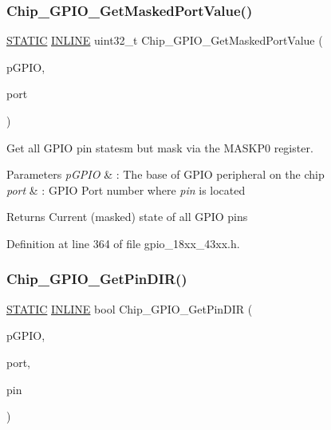 \subsubsection{\texorpdfstring{Chip\+\_\+\+G\+P\+I\+O\+\_\+\+Get\+Masked\+Port\+Value()}{Chip\_GPIO\_GetMaskedPortValue()}}
{\footnotesize\ttfamily \hyperlink{group___l_p_c___types___public___macros_ga10b2d890d871e1489bb02b7e70d9bdfb}{S\+T\+A\+T\+IC} \hyperlink{spifi__18xx__43xx_8h_a2eb6f9e0395b47b8d5e3eeae4fe0c116}{I\+N\+L\+I\+NE} uint32\+\_\+t Chip\+\_\+\+G\+P\+I\+O\+\_\+\+Get\+Masked\+Port\+Value (\begin{DoxyParamCaption}\item[{\hyperlink{struct_l_p_c___g_p_i_o___t}{L\+P\+C\+\_\+\+G\+P\+I\+O\+\_\+T} $\ast$}]{p\+G\+P\+IO,  }\item[{uint8\+\_\+t}]{port }\end{DoxyParamCaption})}



Get all G\+P\+IO pin statesm but mask via the M\+A\+S\+K\+P0 register. 


\begin{DoxyParams}{Parameters}
{\em p\+G\+P\+IO} & \+: The base of G\+P\+IO peripheral on the chip \\
\hline
{\em port} & \+: G\+P\+IO Port number where {\itshape pin} is located \\
\hline
\end{DoxyParams}
\begin{DoxyReturn}{Returns}
Current (masked) state of all G\+P\+IO pins 
\end{DoxyReturn}


Definition at line 364 of file gpio\+\_\+18xx\+\_\+43xx.\+h.

\mbox{\label{group___g_p_i_o__18_x_x__43_x_x_ga5f36fe1a2c2b2eb958133c27cb65bee5}} 
\subsubsection{\texorpdfstring{Chip\+\_\+\+G\+P\+I\+O\+\_\+\+Get\+Pin\+D\+I\+R()}{Chip\_GPIO\_GetPinDIR()}}
{\footnotesize\ttfamily \hyperlink{group___l_p_c___types___public___macros_ga10b2d890d871e1489bb02b7e70d9bdfb}{S\+T\+A\+T\+IC} \hyperlink{spifi__18xx__43xx_8h_a2eb6f9e0395b47b8d5e3eeae4fe0c116}{I\+N\+L\+I\+NE} bool Chip\+\_\+\+G\+P\+I\+O\+\_\+\+Get\+Pin\+D\+IR (\begin{DoxyParamCaption}\item[{\hyperlink{struct_l_p_c___g_p_i_o___t}{L\+P\+C\+\_\+\+G\+P\+I\+O\+\_\+T} $\ast$}]{p\+G\+P\+IO,  }\item[{uint8\+\_\+t}]{port,  }\item[{uint8\+\_\+t}]{pin }\end{DoxyParamCaption})}



